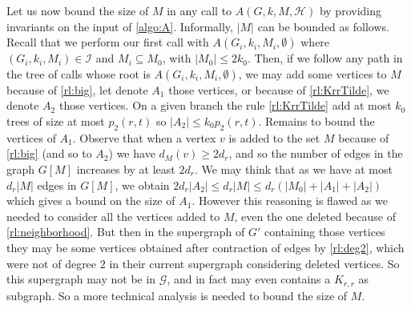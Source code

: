 \documentclass{amsart}
\newcommand{\G}{\mathcal{G}}
\newcommand{\I}{\mathcal{I}}
\newcommand{\mH}{\mathcal{H}}
\newcommand{\ruleref}[1]{\hyperref[#1]{\ref*{#1}}}
\begin{document}
Let us now bound the size of $M$ in any call to $A(G,k,M,\mH)$ by providing invariants on the input of \autoref{algo:A}.
Informally, $|M|$ can be bounded as follows.
Recall that we perform our first call with $A(G_i,k_i,M_i,\emptyset)$ where $(G_i,k_i,M_i) \in \I$ and $M_i \subseteq M_0$, with $|M_0| \le 2k_0$.
Then, if we follow any path in the tree of calls whose root is $A(G_i,k_i,M_i,\emptyset)$, we may add some vertices to $M$ because of \ruleref{rl:big}, let denote $A_1$ those vertices, or because of \ruleref{rl:KrrTilde}, we denote $A_2$ those vertices. On a given branch the rule \ruleref{rl:KrrTilde} add at most $k_0$ trees of size at most $p_2(r,t)$ so $|A_2|\leq k_0p_2(r,t)$. Remains to bound the vertices of $A_1$. Observe that when a vertex $v$ is added to the set $M$ because of \ruleref{rl:big} (and so to $A_2$) we have $d_M(v)\geq 2d_r$, and so the number of edges in the graph $G[M]$ increases by at least $2d_r$. We may think that as we have at most $d_r|M|$ edges in $G[M]$, we obtain $2d_r|A_2|\leq d_r|M| \leq d_r(|M_0|+|A_1|+|A_2|)$ which gives a bound on the size of $A_1$. However this reasoning is flawed as we needed to consider all the vertices added to $M$, even the one deleted because of \ruleref{rl:neighborhood}. But then in the supergraph of $G'$ containing those vertices they may be some vertices obtained after contraction of edges by \ruleref{rl:deg2}, which were not of degree $2$ in their current supergraph considering deleted vertices. So this supergraph may not be in $\G$, and in fact may even contains a $K_{r,r}$ as subgraph. So a more technical analysis is needed to bound the size of $M$.
\end{document}
